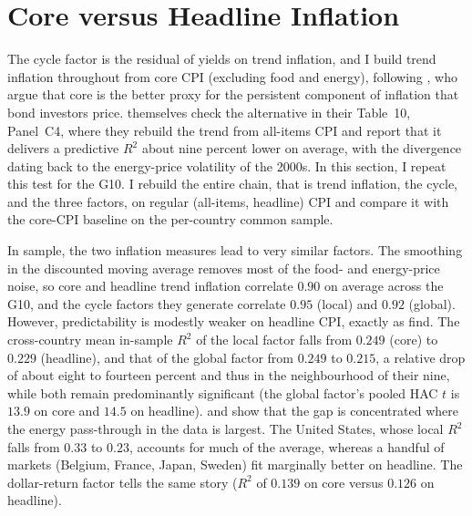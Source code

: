 \section{Core versus Headline Inflation}
\label{sec:rob-core-headline}

The cycle factor is the residual of yields on trend inflation, and I
build trend inflation throughout from core CPI (excluding food and energy),
following \citet{cieslak2015}, who argue that core is the better proxy for the
persistent component of inflation that bond investors price. \citet{cieslak2015} themselves check the alternative in their Table~10,
Panel~C4, where they rebuild the trend from all-items CPI and report that it
delivers a predictive $R^{2}$ about nine percent lower on average, with the
divergence dating back to the energy-price volatility of the 2000s. In this
section, I repeat this test for the G10. I rebuild the entire chain, that is
trend inflation, the cycle, and the three factors, on regular (all-items,
headline) CPI and compare it with the core-CPI baseline on the per-country
common sample.

In sample, the two inflation measures lead to very similar factors. The smoothing
in the discounted moving average removes most of the food- and energy-price noise,
so core and headline trend inflation correlate $0.90$ on average across the
G10, and the cycle factors they generate correlate $0.95$ (local) and $0.92$
(global). However, predictability is modestly weaker on headline CPI, exactly
as \citet{cieslak2015} find. The cross-country mean in-sample $R^{2}$ of the local
factor falls from $0.249$ (core) to $0.229$ (headline), and that of the global
factor from $0.249$ to $0.215$, a relative drop of about eight to fourteen percent
and thus in the neighbourhood of their nine, while both remain predominantly
significant (the global factor's pooled HAC $t$ is $13.9$ on core and $14.5$ on
headline).  and  show
that the gap is concentrated where the energy pass-through in the data is
largest. The United States, whose local $R^{2}$ falls from $0.33$ to $0.23$,
accounts for much of the average, whereas a handful of markets (Belgium, France,
Japan, Sweden) fit marginally better on headline. The dollar-return factor tells
the same story ($R^{2}$ of $0.139$ on core versus $0.126$ on headline).


\begin{table}[t]
  \caption{Core versus headline CPI: out-of-sample}
  \label{tab:rob-core-headline-oos}
  \centering
  
\end{table}

